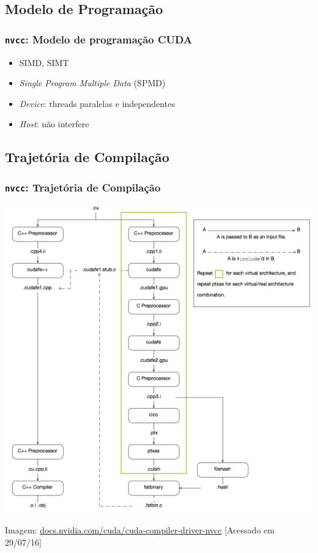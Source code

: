 \documentclass[10pt, compress]{beamer}
\begin{document}
\subsection{Modelo de Programação}

\begin{frame}
    \frametitle{\texttt{nvcc}: Modelo de programação CUDA}
    \begin{itemize}
        \item SIMD, SIMT
        \item \textit{Single Program Multiple Data} (SPMD)
            \pause
        \item \textit{Device}: \alert{threads} paralelas e \alert{independentes}
        \item \textit{Host}: não interfere
    \end{itemize}
\end{frame}

\subsection{Trajetória de Compilação}

\begin{frame}
    \frametitle{\texttt{nvcc}: Trajetória de Compilação}
    \centering
    \includegraphics[width=.7\textwidth]{cuda-compilation}
    \vfill

    \begin{center}
        \tiny{Imagem: \url{docs.nvidia.com/cuda/cuda-compiler-driver-nvcc} [Acessado em 29/07/16]}
    \end{center}
\end{frame}
\end{document}
